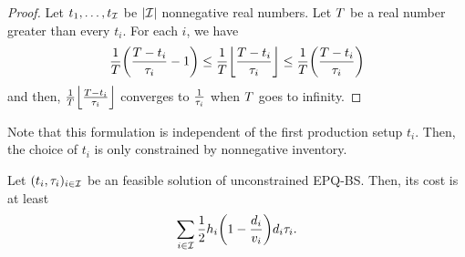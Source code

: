 \begin{proof}
Let $t_1,\ldots,t_{\mathcal{I}}$ be $\card{\REF}$ nonnegative real numbers.
Let $T$ be a real number greater than every $t_i$.
For each $i$, we have
\begin{equation}
\frac{1}{\horizon}\bracket{\frac{\horizon-t_i}{\cover_i}-1}
\le
\frac{1}{\horizon}\left\lfloor\frac{\horizon-t_i}{\cover_i}\right\rfloor
\le
\frac{1}{\horizon}\bracket{\frac{\horizon-t_i}{\cover_i}}
\end{equation}
and then, $\frac{1}{\horizon}\left\lfloor\frac{\horizon-t_i}{\cover_i}\right\rfloor$ converges to $\frac{1}{\tau_i}$ when $T$ goes to infinity.
\end{proof}


Note that this formulation is independent of the first production setup $t_i$.
Then, the choice of $t_i$ is only constrained by nonnegative inventory.


\begin{lem}\label{lem:lot-size:deterministic:single-line:models:ZIO}
Let $\bracket{t_i,\cover_i}_{i\in\REF}$ be an feasible solution of unconstrained EPQ-BS.
Then, its cost is at least
\begin{equation}
  \sum_{i\in\REF}\frac{1}{2}\holding_i\bracket{1-\frac{\demand_i}{\rate_i}}\demand_i\cover_i.
\end{equation}
\end{lem}


